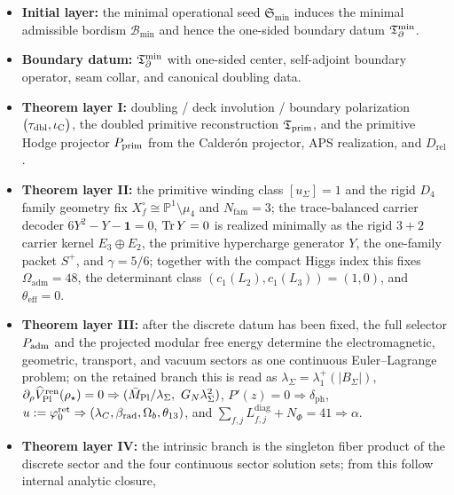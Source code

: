 \begin{tcolorbox}[colback=tfptblue!2, colframe=tfptblue!40, breakable,
    title={Closed theorem surface}, colbacktitle=tfptblue!60]
\begin{itemize}[leftmargin=1.5em, topsep=3pt, itemsep=3pt]
    \item \textbf{Initial layer:} the minimal operational seed $\mathfrak S_{\min}$ induces the minimal admissible bordism $\mathcal B_{\min}$ and hence the one-sided boundary datum $\mathfrak T_{\partial}^{\min}$.
    \item \textbf{Boundary datum:} $\mathfrak T_{\partial}^{\min}$ with one-sided center, self-adjoint boundary operator, seam collar, and canonical doubling data.
    \item \textbf{Theorem layer I:} doubling / deck involution / boundary polarization $\bigl(\tau_{\mathrm{dbl}},\iota_{\mathrm C}\bigr)$, the doubled primitive reconstruction $\mathfrak T_{\mathrm{prim}}$, and the primitive Hodge projector $P_{\mathrm{prim}}$ from the Calder\'on projector, APS realization, and $D_{\mathrm{rel}}$.
    \item \textbf{Theorem layer II:} the primitive winding class $[u_\Sigma]=1$ and the rigid $D_4$
    family geometry fix $X_f^\circ\cong\mathbb P^1\setminus\mu_4$ and $N_{\mathrm{fam}}=3$; the
    trace-balanced carrier decoder $6Y^2-Y-\mathbf 1=0$, $\operatorname{Tr} Y=0$ is realized minimally as the
    rigid $3+2$ carrier kernel $E_3\oplus E_2$, the primitive hypercharge generator $Y$, the
    one-family packet $S^+$, and $\gamma=5/6$; together with the compact Higgs index this fixes
    $\Omega_{\mathrm{adm}}=48$, the determinant class $(c_1(L_2),c_1(L_3))=(1,0)$, and
    $\theta_{\mathrm{eff}}=0$.
    \item \textbf{Theorem layer III:} after the discrete datum has been fixed, the full selector
    $P_{\mathrm{adm}}$ and the projected modular free energy determine the electromagnetic, geometric,
    transport, and vacuum sectors as one continuous Euler--Lagrange problem; on the retained branch
    this is read as $\lambda_\Sigma=\lambda_1^+(|B_\Sigma|)$,
    $\partial_\rho\widehat V_{\mathrm{Pl}}^{\mathrm{ren}}(\rho_\star)=0\Rightarrow(\Mpl/\lambda_\Sigma,\ G_N\lambda_\Sigma^2)$,
    $P'(z)=0\Rightarrow\delta_{\mathrm{ph}}$,
    $u:=\varphi_0^{\mathrm{ret}}\Rightarrow(\lambda_C,\beta_{\mathrm{rad}},\Omega_b,\theta_{13})$, and
    $\sum_{f,j}L_{f,j}^{\mathrm{diag}}+N_\Phi=41\Rightarrow\alpha$.
    \item \textbf{Theorem layer IV:} the intrinsic branch is the singleton fiber product of the discrete
    sector and the four continuous sector solution sets; from this follow internal analytic closure,

\end{itemize}
\end{tcolorbox}
